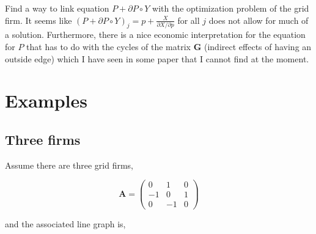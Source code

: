 \documentclass[american]{scrartcl}
\newcommand{\matr}[1]{\bm{#1}}
\begin{document}
Find a way to link equation $P + \partial P \circ Y$ with the optimization problem of the grid firm. It seems like $(P + \partial P \circ Y)_j = p + \frac{X}{\partial X / \partial p}$ for all $j$ does not allow for much of a solution. Furthermore, there is a nice economic interpretation for the equation for $P$ that has to do with the cycles of the matrix $\matr{G}$ (indirect effects of having an outside edge) which I have seen in some paper that I cannot find at the moment.

\newpage %

\section{Examples}

\subsection{Three firms}

Assume there are three grid firms, \hspace{2em}

\vspace{0.5cm}
\begin{minipage}{0.6\textwidth}
\end{minipage} \hfill
\begin{minipage}{0.35\textwidth}
	\begin{equation*}
		\matr{A} = \begin{pmatrix}
			0   & 1  & 0 \\
			- 1 & 0  & 1 \\
			0   & -1 & 0
		\end{pmatrix}
	\end{equation*}
\end{minipage}
\vspace{0.5cm}


and the associated line graph is,
\end{document}
